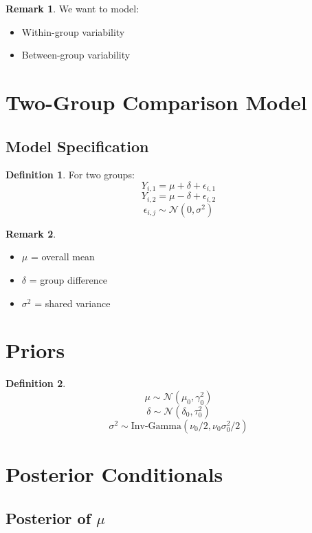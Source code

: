 \documentclass[12pt,oneside]{book}
\numberwithin{equation}{section}
\theoremstyle{definition}
\newtheorem{definition}{Definition}[section]
\newtheorem{remark}{Remark}[section]
\theoremstyle{plain}
\theoremstyle{remark}
\newcommand{\Normal}{\mathcal{N}}
\begin{document}
\begin{remark}
We want to model:
\begin{itemize}
\item Within-group variability
\item Between-group variability
\end{itemize}
\end{remark}

\section{Two-Group Comparison Model}

\subsection{Model Specification}

\begin{definition}
For two groups:
$$
Y_{i,1} = \mu + \delta + \epsilon_{i,1}
$$
$$
Y_{i,2} = \mu - \delta + \epsilon_{i,2}
$$
$$
\epsilon_{i,j} \sim \Normal(0, \sigma^2)
$$
\end{definition}

\begin{remark}
\begin{itemize}
\item $\mu$ = overall mean
\item $\delta$ = group difference
\item $\sigma^2$ = shared variance
\end{itemize}
\end{remark}

\section{Priors}

\begin{definition}
$$
\mu \sim \Normal(\mu_0, \gamma_0^2)
$$
$$
\delta \sim \Normal(\delta_0, \tau_0^2)
$$
$$
\sigma^2 \sim \text{Inv-Gamma}(\nu_0/2, \nu_0\sigma_0^2/2)
$$
\end{definition}

\section{Posterior Conditionals}

\subsection{Posterior of $\mu$}
\end{document}
